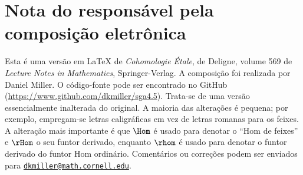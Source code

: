 
\section*{Nota do responsável pela composição eletrônica}

Esta é uma versão em \LaTeX{} de \emph{Cohomologie Étale}, de Deligne,
volume 569 de \emph{Lecture Notes in Mathematics}, Springer-Verlag. A
composição foi realizada por Daniel Miller. O código-fonte pode ser encontrado
no GitHub
(\url{https://www.github.com/dkmiller/sga4.5}). Trata-se de uma versão
essencialmente inalterada do original. A maioria das alterações é pequena; por
exemplo, empregam-se letras caligráficas em vez de letras romanas para os
feixes. A alteração mais importante é que $\Hom$ é usado para denotar o
``Hom de feixes'' e $\rHom$ o seu funtor derivado, enquanto $\rhom$ é usado
para denotar o funtor derivado do funtor Hom ordinário. Comentários ou
correções podem ser enviados para
\href{mailto:dkmiller@math.cornell.edu}{\nolinkurl{dkmiller@math.cornell.edu}}.
